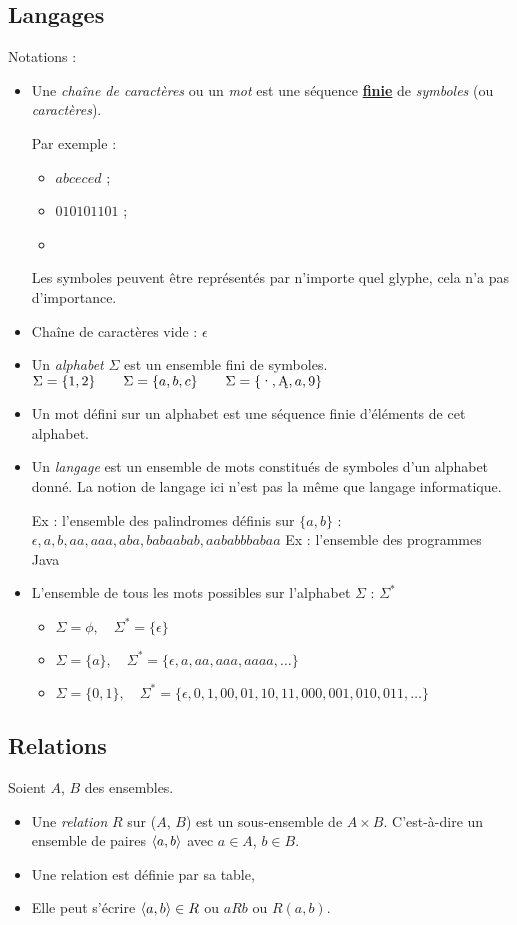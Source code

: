 \subsection{Langages}
\label{subsec:Langages}
Notations :
\begin{itemize}
    \item Une \emph{chaîne de caractères} ou un \emph{mot} est une séquence \textbf{\underline{finie}} de \emph{symboles} (ou \emph{caractères}).

    Par exemple :
    	\begin{itemize}
    		\item $abceced$ ;
    		\item $010101101$ ;
     		\item {}
    	\end{itemize}
    	Les symboles peuvent être représentés par n'importe quel glyphe, cela n'a pas d'importance.
	\item Chaîne de caractères vide : $\epsilon$
    \item Un \emph{alphabet} $\Sigma$ est un ensemble fini de symboles.
    	\subitem $\Sigma = \{1, 2\}\qquad\Sigma = \{a, b, c\}\qquad\Sigma = \{\ding{189},\ding{129},a,9\}$
    \item Un mot défini sur un alphabet est une séquence finie d'éléments de cet alphabet.
    \item Un \emph{langage} est un ensemble de mots constitués de symboles d'un alphabet donné. La notion de langage ici n'est pas la même que langage informatique.

    	\subitem Ex : l'ensemble des palindromes définis sur $\{a, b\}$ : $\epsilon, a, b, aa, aaa, aba, babaabab, aababbbabaa$
	\subitem Ex : l'ensemble des programmes Java
	\item L'ensemble de tous les mots possibles sur l'alphabet $\Sigma$ :\; $\Sigma^*$
		\begin{itemize}
			\item $\Sigma = \phi,\quad \Sigma^* = \{\epsilon\}$
			\item $\Sigma = \{a\},\quad \Sigma^* = \{\epsilon, a,aa,aaa,aaaa, \ldots\}$
			\item $\Sigma = \{0,1\},\quad \Sigma^* = \{\epsilon, 0,1,00,01,10,11,000,001,010,011, \ldots\}$
		\end{itemize}
\end{itemize}


\subsection{Relations}
\label{subsec:relations}
Soient $A$, $B$ des ensembles.
\begin{itemize}
	\item Une \emph{relation} $R$ sur ($A$, $B$) est un sous-ensemble de $A \times B$. C'est-à-dire
		un ensemble de paires $\langle a,b \rangle$ avec $a\in A$, $b\in B$.
	\item Une relation est définie par sa table,
	\item Elle peut s'écrire $\langle a,b \rangle \in R$ ou $aR b$ ou $R(a,b)$.
\end{itemize}

